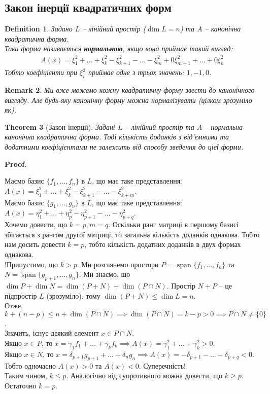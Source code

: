 \documentclass[a4paper, 10pt]{article}
\makeatletter
\theoremstyle{theoremdd}
\newtheorem{theorem}{Theorem}[subsection]
\newtheorem{definition}[theorem]{Definition}
\newtheorem{remark}[theorem]{Remark}
\DeclareMathOperator{\linspan}{span}
\renewenvironment{proof}[1][Proof.\\]{\par
\pushQED{\hfill \qed}%
\normalfont \topsep6\p@\@plus6\p@\relax
\trivlist
\item\relax
{\bfseries
#1\@addpunct{.}}\hspace\labelsep\ignorespaces
}{%
\popQED\endtrivlist\@endpefalse
}
\makeatother
\begin{document}
\subsection{Закон інерції квадратичних форм}
\begin{definition}
Задано $L$ -- лінійний простір ($\dim L = n$) та $A$ -- канонічна квадратична форма.\\
Така форма називається \textbf{нормальною}, якщо вона приймає такий вигляд:
\begin{align*}
A(x) = \xi_1^2 + \dots + \xi_k^2 - \xi_{k+1}^2 - \dots - \xi_{m}^2 + 0 \xi_{m+1}^2 + \dots + 0 \xi_n^2
\end{align*}
Тобто коефіцієнти при $\xi_i^2$ приймає одне з трьох значень: $1,-1,0$.
\end{definition}

\begin{remark}
Ми вже можемо кожну квадратичну форму звести до канонічного вигляду. Але будь-яку канонічну форму можна нормалізувати (цілком зрозуміло як).
\end{remark}

\begin{theorem}[Закон інерції]
Задані $L$ -- лінійний простір та $A$ -- нормальна канонічна квадратична форма. Тоді кількість доданків з від'ємними та додатними коефіцієнтами не залежить від способу зведення до цієї форми.
\end{theorem}

\begin{proof}
Маємо базис $\{f_1,\dots,f_n\}$ в $L$, що має таке представлення: $A(x) = \xi_1^2 + \dots + \xi_k^2 - \xi_{k+1}^2 - \dots - \xi_{k+m}^2$.\\
Маємо базис $\{g_1,\dots,g_n\}$ в $L$, що має таке представлення: $A(x) = \eta_1^2 + \dots + \eta_p^2 - \eta_{p+1}^2 - \dots - \eta_{p+q}^2$.\\
Хочемо довести, що $k=p, m=q$. Оскільки ранг матриці в першому базисі збігається з рангом другої матриці, то загальна кількість доданків однакова. Тобто нам досить довести $k=p$, тобто кількість додатних доданків в двух формах однакова.\\
!Припустимо, що $k > p$. Ми розглянемо простори $P = \linspan\{f_1,\dots,f_k\}$ та $N = \linspan\{g_{p+1},\dots,g_n\}$. Ми знаємо, що $\dim P + \dim N = \dim (P+N) + \dim (P \cap N)$. Простір $N+P$ -- це підпростір $L$ (зрозуміло), тому $\dim (P+N) \leq \dim L = n$.\\
Отже, $k + (n-p) \leq n + \dim (P \cap N) \implies \dim (P \cap N) = k - p > 0 \implies P \cap N \neq \{0\}$.\\
Значить, існує деякий елемент $x \in P \cap N$. \\
Якщо $x \in P$, то $x = \gamma_1 f_1 + \dots + \gamma_k f_k \implies A(x) = \gamma_1^2 + \dots + \gamma_k^2 > 0$.\\
Якщо $x \in N$, то $x = \delta_{p+1} g_{p+1} + \dots + \delta_n g_n \implies A(x) = -\delta_{p+1} - \dots - \delta_{p+q} < 0$.\\
Тобто одночасно $A(x) > 0$ та $A(x) < 0$. Суперечність!\\
Таким чином, $k \leq p$. Аналогічно від супротивного можна довести, що $k \geq p$. Остаточно $k=p$. 
\end{proof}
\end{document}
